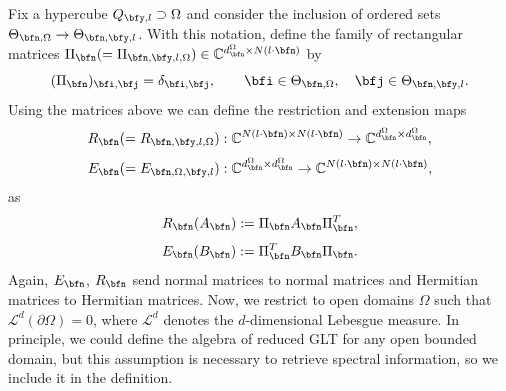 \documentclass{amsart}
\begin{document}
Fix a hypercube $Q_{\bfy,l}\supset\Omega$ and consider the inclusion of ordered sets $\Theta_{\bfn,\Omega}\to\Theta_{\bfn,\bfy,l}$. With this notation, define the family of rectangular matrices $\Pi_{\bfn}(=\Pi_{\bfn,\bfy,l,\Omega})\in\mathbb{C}^{d_{\bfn}^{\Omega}\times N(l\cdot\bfn)}$ by
\begin{equation*}
    (\Pi_{\bfn})_{\bfi,\bfj}=\delta_{\bfi,\bfj},\qquad\bfi\in\Theta_{\bfn,\Omega},\quad \bfj\in\Theta_{\bfn,\bfy,l}.
\end{equation*}
Using the matrices above we can define the restriction and extension maps\\
\begin{equation*}
	R_{\bfn}(=R_{{\bfn, \bfy},l,\Omega}):\mathbb{C}^{N(l\cdot \bfn)\times N(l\cdot\bfn)}\to\mathbb{C}^{d_{\bfn}^{\Omega}\times d_{\bfn}^{\Omega}},
\end{equation*}
\begin{equation*}
	E_{\bfn}(=E_{\bfn,\Omega,\bfy,l}):\mathbb{C}^{d_{\bfn}^{\Omega}\times d_{\bfn}^{\Omega}}\to\mathbb{C}^{N(l\cdot \bfn)\times N(l\cdot\bfn)},
\end{equation*}
as
\begin{equation*}
	R_{\bfn}(A_{\bfn}):=\Pi_{\bfn}A_{\bfn}\Pi_{\bfn}^T,
\end{equation*}
\begin{equation*}
	E_{\bfn}(B_{\bfn}):=\Pi_{\bfn}^T B_{\bfn}\Pi_{\bfn}. 
\end{equation*}
Again, $E_{\bfn}$, $R_{\bfn}$ send normal matrices to normal matrices and Hermitian matrices to Hermitian matrices. 
Now, we restrict to open domains $\Omega$ such that $\mathcal{L}^d(\partial\Omega)=0$, where $\mathcal{L}^d$ denotes the $d$-dimensional Lebesgue measure. In principle, we could define the algebra of reduced GLT for any open bounded domain, but this assumption is necessary to retrieve spectral information, so we include it in the definition.
\end{document}
